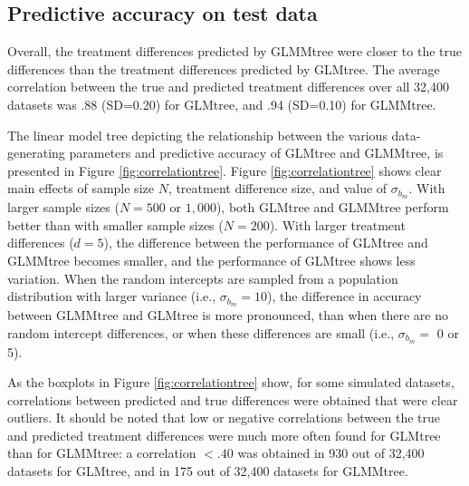 \documentclass[nobf,doc]{apa}
\begin{document}
\subsection{Predictive accuracy on test data}

Overall, the treatment differences predicted by GLMMtree were closer to the true differences than the treatment differences predicted by GLMtree. The average correlation between the true and predicted treatment differences over all 32,400 datasets was .88 (SD=0.20) for GLMtree, and .94 (SD=0.10) for GLMMtree.

The linear model tree depicting the relationship between the various data-generating parameters and predictive accuracy of GLMtree and GLMMtree, is presented in Figure \ref{fig:correlationtree}. Figure \ref{fig:correlationtree} shows clear main effects of sample size $N$, treatment difference size, and value of $\sigma_{b_m}$. With larger sample sizes ($N = 500$ or $1,000$), both GLMtree and GLMMtree perform better than with smaller sample sizes ($N = 200$). With larger treatment differences ($d=5$), the difference between the performance of GLMtree and GLMMtree becomes smaller, and the performance of GLMtree shows less variation. When the random intercepts are sampled from a population distribution with larger variance (i.e., $\sigma_{b_m} = 10$), the difference in accuracy between GLMMtree and GLMtree is more pronounced, than when there are no random intercept differences, or when these differences are small (i.e., $\sigma_{b_m} = $ 0 or 5).

As the boxplots in Figure \ref{fig:correlationtree} show, for some simulated datasets, correlations between predicted and true differences were obtained that were clear outliers. It should be noted that low or negative correlations between the true and predicted treatment differences were much more often found for GLMtree than for GLMMtree: a correlation $<.40$ was obtained in 930 out of 32,400 datasets for GLMtree, and in 175 out of 32,400 datasets for GLMMtree. 
\end{document}
